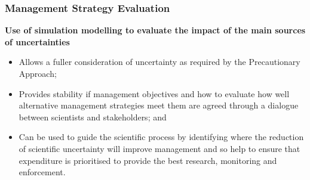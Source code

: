 \documentclass{beamer}
\newcommand\Fontviii{\fontsize{8}{10}\selectfont}
\begin{document}
\begin{frame}\frametitle{Management Strategy Evaluation} 
  \smallskip\textbf{Use of simulation modelling to evaluate the impact of the main sources of uncertainties}\smallskip 
  \Fontviii
  \begin{itemize} %
     \item Allows a fuller consideration of uncertainty as required by the Precautionary Approach; 
     \item Provides stability if management objectives and how to evaluate how well alternative  
	   management strategies meet them are agreed through a dialogue between scientists and stakeholders; and 
     \item Can be used to guide the scientific process by identifying where the reduction of scientific 
	   uncertainty will improve management and so help to ensure that expenditure is prioritised to provide 
	   the best research, monitoring and enforcement. 
  \end{itemize}
\end{frame}
\end{document}
